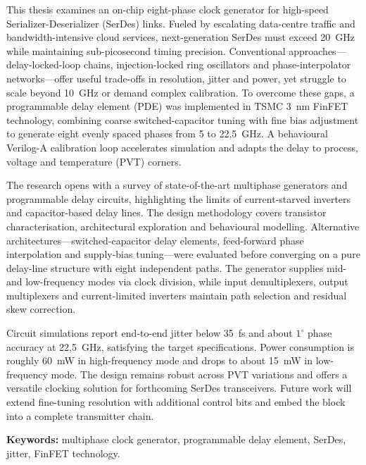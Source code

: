 This thesis examines an on-chip eight-phase clock generator for high-speed Serializer-Deserializer (SerDes) links. Fueled by escalating data-centre traffic and bandwidth-intensive cloud services, next-generation SerDes must exceed 20~GHz while maintaining sub-picosecond timing precision. Conventional approaches---delay-locked-loop chains, injection-locked ring oscillators and phase-interpolator networks---offer useful trade-offs in resolution, jitter and power, yet struggle to scale beyond 10~GHz or demand complex calibration. To overcome these gaps, a programmable delay element (PDE) was implemented in TSMC 3~nm FinFET technology, combining coarse switched-capacitor tuning with fine bias adjustment to generate eight evenly spaced phases from 5 to 22{,}5~GHz. A behavioural Verilog-A calibration loop accelerates simulation and adapts the delay to process, voltage and temperature (PVT) corners.

The research opens with a survey of state-of-the-art multiphase generators and programmable delay circuits, highlighting the limits of current-starved inverters and capacitor-based delay lines. The design methodology covers transistor characterisation, architectural exploration and behavioural modelling. Alternative architectures---switched-capacitor delay elements, feed-forward phase interpolation and supply-bias tuning---were evaluated before converging on a pure delay-line structure with eight independent paths. The generator supplies mid- and low-frequency modes via clock division, while input demultiplexers, output multiplexers and current-limited inverters maintain path selection and residual skew correction.

Circuit simulations report end-to-end jitter below 35~fs and about $1^{\circ}$ phase accuracy at 22{,}5~GHz, satisfying the target specifications. Power consumption is roughly 60~mW in high-frequency mode and drops to about 15~mW in low-frequency mode. The design remains robust across PVT variations and offers a versatile clocking solution for forthcoming SerDes transceivers. Future work will extend fine-tuning resolution with additional control bits and embed the block into a complete transmitter chain.

\medskip
\noindent\textbf{Keywords:} multiphase clock generator, programmable delay element, SerDes, jitter, FinFET technology.
